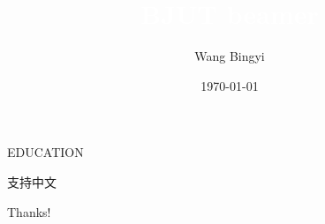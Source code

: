 \documentclass[11pt,xcolor={table},UFTF8]{beamer}
\theoremstyle{plain}
\theoremstyle{definition}
\theoremstyle{remark}
\numberwithin{equation}{section}
\begin{document}
	
	
	
	\title{\textcolor{white}{BJUT beamer}}
	\author{Wang Bingyi}
	\date{\usvardate\today}
	
\begin{frame}{}
	\titlepage
\end{frame}

\begin{frame}{EDUCATION}
	\begin{block}{}
		支持中文
	\end{block}
\end{frame}

\begin{frame}{}
	\begin{center}
		{\Huge\calligra Thanks!}
	\end{center}
\end{frame}
\end{document}
